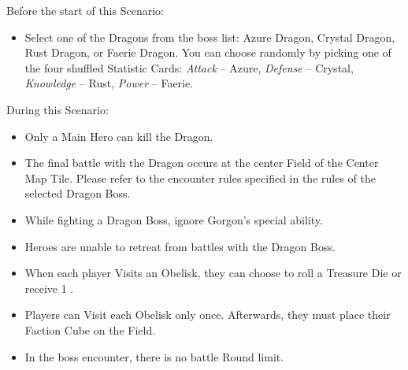 \begin{multicols*}{2}
Before the start of this Scenario:

\begin{itemize}
  \item Select one of the Dragons from the boss list: Azure Dragon, Crystal Dragon, Rust Dragon, or Faerie Dragon.
    You can choose randomly by picking one of the four shuffled Statistic Cards: \textit{Attack} -- Azure, \textit{Defense} -- Crystal, \textit{Knowledge} -- Rust, \textit{Power} -- Faerie.
\end{itemize}

During this Scenario:

\begin{itemize}
  \item Only a Main Hero can kill the Dragon.
  \item The final battle with the Dragon occurs at the center Field of the Center Map Tile.
    Please refer to the encounter rules specified in the rules of the selected Dragon Boss.
  \item While fighting a Dragon Boss, ignore Gorgon's special ability.
  \item Heroes are unable to retreat from battles with the Dragon Boss.
  \item When each player Visits an Obelisk, they can choose to roll a Treasure Die or receive 1 .
  \item Players can Visit each Obelisk only once.
    Afterwards, they must place their Faction Cube on the Field.
  \item In the boss encounter, there is no battle Round limit.
\end{itemize}


\end{multicols*}

\clearpage

